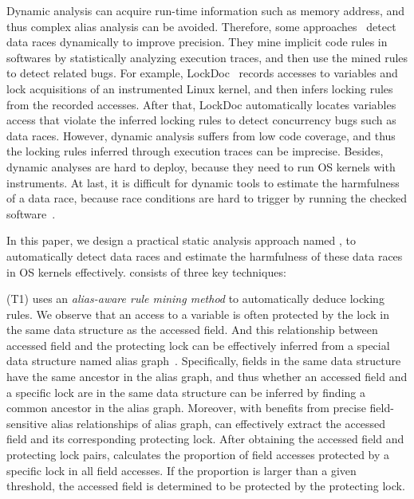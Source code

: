 Dynamic analysis can acquire run-time information such as memory address, and 
thus complex alias analysis can be avoided. Therefore, some 
approaches~\cite{Lochmann:EuroSys19, Lu:SOSP07, Lu:FSE18, Joshi:ASE08, 
Liu:NSDI07} detect data races dynamically to improve precision. They mine 
implicit code rules in softwares by statistically analyzing execution traces, 
and then use the mined rules to detect related bugs. For example, 
LockDoc~\cite{Lochmann:EuroSys19} records accesses to variables and lock 
acquisitions of an instrumented Linux kernel, and then infers locking rules 
from the recorded accesses. After that, LockDoc automatically locates variables 
access that violate the inferred locking rules to detect concurrency bugs such 
as data races. However, dynamic analysis suffers from low code coverage, and 
thus the locking rules inferred through execution traces can be imprecise. 
Besides, dynamic analyses are hard to deploy, because they need to run OS 
kernels with instruments. At last, it is difficult for dynamic tools to 
estimate the harmfulness of a data race, because race conditions are hard to 
trigger by running the checked software~\cite{Fonseca:DSN10, 
Burckhardt:ASPLOS10, Liu:FSE14, Zhou:EASE15}.

In this paper, we design a practical static analysis approach named \sys, 
to automatically detect data races and estimate the harmfulness of these data 
races in OS kernels effectively. \sys consists of three key techniques:

(T1) \sys uses an {\em alias-aware rule mining method} to automatically 
deduce locking rules. We observe that an access to a variable is often 
protected by the lock in the same data structure as the accessed field. And 
this relationship between accessed field and the protecting lock can be 
effectively inferred from a special data structure named alias 
graph~\cite{Li:ASPLOS22, Kastrinis:CC18}. Specifically, fields in the same data 
structure have the same ancestor in the alias graph, and thus whether an 
accessed field and a specific lock are in the same data structure can be 
inferred by finding a common ancestor in the alias graph. Moreover, with 
benefits from precise field-sensitive alias relationships of alias graph, 
\sys can effectively extract the accessed field and its corresponding 
protecting lock. After obtaining the accessed field and protecting lock pairs, 
\sys calculates the proportion of field accesses protected by a specific 
lock in all field accesses. If the proportion is larger than a given threshold, 
the accessed field is determined to be protected by the protecting lock.

